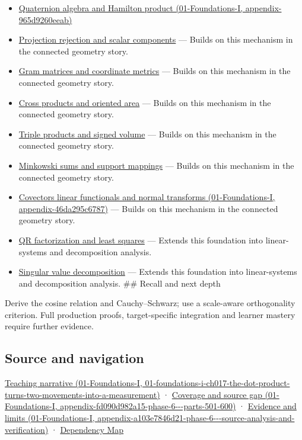 \begin{itemize}
\item
  \href{../01-Foundations-I/main.pdf\#nameddest=appendix-965d9260eeab}{Quaternion algebra and Hamilton product (01-Foundations-I, appendix-965d9260eeab)}
\item
  \hyperref[appendix-505a502c372a]{Projection rejection and scalar components} --- Builds on this mechanism in the connected geometry story.
\item
  \hyperref[appendix-3b863809f82a]{Gram matrices and coordinate metrics} --- Builds on this mechanism in the connected geometry story.
\item
  \hyperref[appendix-2391db8052b1]{Cross products and oriented area} --- Builds on this mechanism in the connected geometry story.
\item
  \hyperref[appendix-5caa058bd9c7]{Triple products and signed volume} --- Builds on this mechanism in the connected geometry story.
\item
  \hyperref[appendix-215ac7099a82]{Minkowski sums and support mappings} --- Builds on this mechanism in the connected geometry story.
\item
  \href{../01-Foundations-I/main.pdf\#nameddest=appendix-46da295c6787}{Covectors linear functionals and normal transforms (01-Foundations-I, appendix-46da295c6787)} --- Builds on this mechanism in the connected geometry story.
\item
  \hyperref[appendix-c3421e6b4f2c]{QR factorization and least squares} --- Extends this foundation into linear-systems and decomposition analysis.
\item
  \hyperref[appendix-1fad5e7f36fa]{Singular value decomposition} --- Extends this foundation into linear-systems and decomposition analysis. \#\# Recall and next depth
\end{itemize}

Derive the cosine relation and Cauchy--Schwarz; use a scale-aware orthogonality criterion. Full production proofs, target-specific integration and learner mastery require further evidence.

\subsection{Source and navigation}\label{appendix-8bc4e8fc547c-source-and-navigation}

\href{../01-Foundations-I/main.pdf\#nameddest=01-foundations-i-ch017-the-dot-product-turns-two-movements-into-a-measurement}{Teaching narrative (01-Foundations-I, 01-foundations-i-ch017-the-dot-product-turns-two-movements-into-a-measurement)} · \href{../01-Foundations-I/main.pdf\#nameddest=appendix-fd090d982a15-phase-6---parts-501-600}{Coverage and source gap (01-Foundations-I, appendix-fd090d982a15-phase-6-\/-\/-parts-501-600)} · \href{../01-Foundations-I/main.pdf\#nameddest=appendix-a103e7846d21-phase-6---source-analysis-and-verification}{Evidence and limits (01-Foundations-I, appendix-a103e7846d21-phase-6-\/-\/-source-analysis-and-verification)} · \hyperref[appendix-4ad47bdd269a]{Dependency Map}
